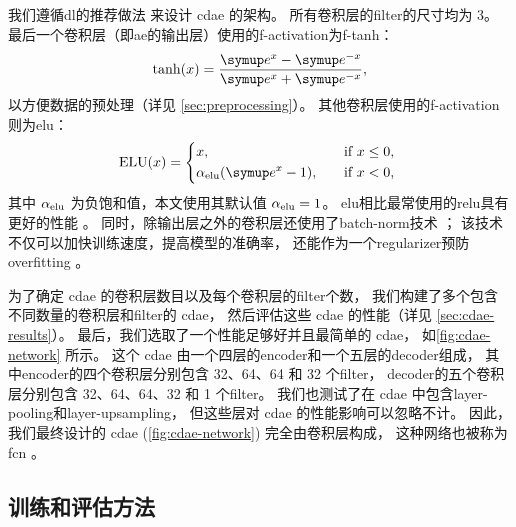 我们遵循\ac{dl}的推荐做法\cite{geron2017,suganuma2018} 来设计 \ac{cdae} 的架构。
所有卷积层的\ac{filter}的尺寸均为 3。
最后一个卷积层（即\ac{ae}的输出层）使用的\ac{f-activation}为\ac{f-tanh}：
\begin{equation}
  \tanh(x) = \frac{\Ce^x - \Ce^{-x}}{\Ce^x + \Ce^{-x}} ,
\end{equation}
以方便数据的预处理（详见 \autoref{sec:preprocessing}）。
其他卷积层使用的\ac{f-activation}则为\ac{elu}\cite{clevert2016}：
\begin{equation}
  \text{ELU}(x) =
    \begin{dcases*}
      x , \quad & if $x \le 0$, \\
      \alpha_{\R{elu}} (\Ce^x - 1) , \quad & if $x < 0$,
    \end{dcases*}
\end{equation}
其中 $\alpha_{\mathrm{elu}}$ 为负饱和值，本文使用其默认值 $\alpha_{\mathrm{elu}} = 1$。
\ac{elu}相比最常使用的\ac{relu}具有更好的性能 \cite{clevert2016,geron2017}。
同时，除输出层之外的卷积层还使用了\ac{batch-norm}技术 \cite{ioffe2015}；
该技术不仅可以加快训练速度，提高模型的准确率，
还能作为一个\ac{regularizer}预防\ac{overfitting} \cite{geron2017}。

为了确定 \ac{cdae} 的卷积层数目以及每个卷积层的\ac{filter}个数，
我们构建了多个包含不同数量的卷积层和\ac{filter}的 \ac{cdae}，
然后评估这些 \ac{cdae} 的性能（详见 \autoref{sec:cdae-results}）。
最后，我们选取了一个性能足够好并且最简单的 \ac{cdae}，
如\autoref{fig:cdae-network} 所示。
这个 \ac{cdae} 由一个四层的\ac{encoder}和一个五层的\ac{decoder}组成，
其中\ac{encoder}的四个卷积层分别包含 32、64、64 和 32 个\ac{filter}，
\ac{decoder}的五个卷积层分别包含 32、64、64、32 和 1 个\ac{filter}。
我们也测试了在 \ac{cdae} 中包含\ac{layer-pooling}和\ac{layer-upsampling}，
但这些层对 \ac{cdae} 的性能影响可以忽略不计。
因此，我们最终设计的 \ac{cdae} (\autoref{fig:cdae-network}) 完全由卷积层构成，
这种网络也被称为\ac{fcn} \cite{long2015,springenberg2015}。

\subsection{训练和评估方法}
\label{sec:train-eval}

